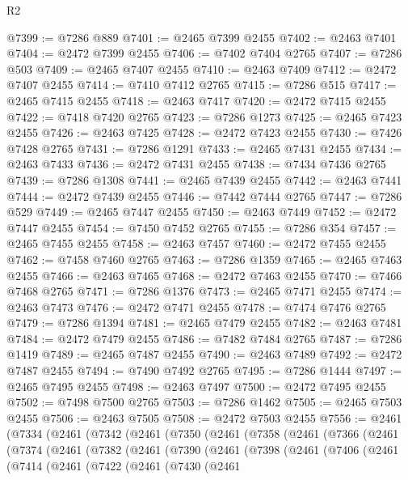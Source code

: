\begin{lexlean}{R2}
\begin{coremodule}
@7399 := @7286 @889
@7401 := @2465 @7399 @2455
@7402 := @2463 @7401
@7404 := @2472 @7399 @2455
@7406 := @7402 @7404 @2765
@7407 := @7286 @503
@7409 := @2465 @7407 @2455
@7410 := @2463 @7409
@7412 := @2472 @7407 @2455
@7414 := @7410 @7412 @2765
@7415 := @7286 @515
@7417 := @2465 @7415 @2455
@7418 := @2463 @7417
@7420 := @2472 @7415 @2455
@7422 := @7418 @7420 @2765
@7423 := @7286 @1273
@7425 := @2465 @7423 @2455
@7426 := @2463 @7425
@7428 := @2472 @7423 @2455
@7430 := @7426 @7428 @2765
@7431 := @7286 @1291
@7433 := @2465 @7431 @2455
@7434 := @2463 @7433
@7436 := @2472 @7431 @2455
@7438 := @7434 @7436 @2765
@7439 := @7286 @1308
@7441 := @2465 @7439 @2455
@7442 := @2463 @7441
@7444 := @2472 @7439 @2455
@7446 := @7442 @7444 @2765
@7447 := @7286 @529
@7449 := @2465 @7447 @2455
@7450 := @2463 @7449
@7452 := @2472 @7447 @2455
@7454 := @7450 @7452 @2765
@7455 := @7286 @354
@7457 := @2465 @7455 @2455
@7458 := @2463 @7457
@7460 := @2472 @7455 @2455
@7462 := @7458 @7460 @2765
@7463 := @7286 @1359
@7465 := @2465 @7463 @2455
@7466 := @2463 @7465
@7468 := @2472 @7463 @2455
@7470 := @7466 @7468 @2765
@7471 := @7286 @1376
@7473 := @2465 @7471 @2455
@7474 := @2463 @7473
@7476 := @2472 @7471 @2455
@7478 := @7474 @7476 @2765
@7479 := @7286 @1394
@7481 := @2465 @7479 @2455
@7482 := @2463 @7481
@7484 := @2472 @7479 @2455
@7486 := @7482 @7484 @2765
@7487 := @7286 @1419
@7489 := @2465 @7487 @2455
@7490 := @2463 @7489
@7492 := @2472 @7487 @2455
@7494 := @7490 @7492 @2765
@7495 := @7286 @1444
@7497 := @2465 @7495 @2455
@7498 := @2463 @7497
@7500 := @2472 @7495 @2455
@7502 := @7498 @7500 @2765
@7503 := @7286 @1462
@7505 := @2465 @7503 @2455
@7506 := @2463 @7505
@7508 := @2472 @7503 @2455
@7556 := @2461
    (@7334
      (@2461
        (@7342
          (@2461
            (@7350
              (@2461
                (@7358
                  (@2461
                    (@7366
                      (@2461
                        (@7374
                          (@2461
                            (@7382
                              (@2461
                                (@7390
                                  (@2461
                                    (@7398
                                      (@2461
                                        (@7406
                                          (@2461
                                            (@7414
                                              (@2461
                                                (@7422
                                                  (@2461
                                                    (@7430
                                                      (@2461

\end{coremodule}
\end{lexlean}
